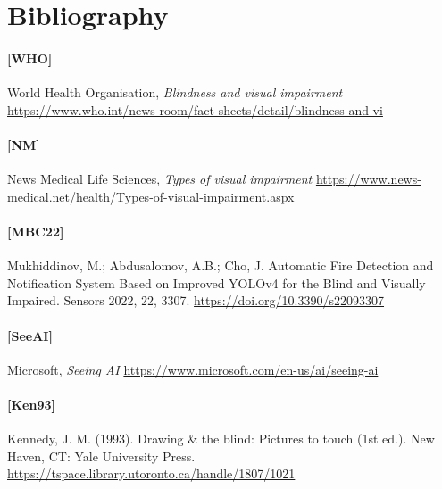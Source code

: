 \documentclass[12pt, letterpaper]{article}
\begin{document}
%

\section{Bibliography}

\paragraph{[WHO]}
\hypertarget{WHOtarget}{}
World Health Organisation, \textit{Blindness and visual impairment} \\
\href{https://www.who.int/news-room/fact-sheets/detail/blindness-and-visual-impairment}{https://www.who.int/news-room/fact-sheets/detail/blindness-and-vi}

\paragraph{[NM]}
\hypertarget{NMtarget}{}
News Medical Life Sciences, \textit{Types of visual impairment}
\href{https://www.news-medical.net/health/Types-of-visual-impairment.aspx}{https://www.news-medical.net/health/Types-of-visual-impairment.aspx}

\paragraph{[MBC22]}
\hypertarget{MBC22target}{}
Mukhiddinov, M.; Abdusalomov, A.B.; Cho, J. Automatic Fire Detection and Notification System Based on Improved YOLOv4 for the Blind and Visually Impaired. Sensors 2022, 22, 3307.
\href{https://doi.org/10.3390/s22093307}{https://doi.org/10.3390/s22093307}

\paragraph{[SeeAI]}
\hypertarget{SeeAItarget}{}
Microsoft, \textit{Seeing AI}
\href{https://www.microsoft.com/en-us/ai/seeing-ai}{https://www.microsoft.com/en-us/ai/seeing-ai}

\paragraph{[Ken93]}
\hypertarget{Ken93target}{}
Kennedy, J. M. (1993). Drawing \& the blind: Pictures to touch (1st ed.). New Haven, CT: Yale University Press.\\
\href{https://tspace.library.utoronto.ca/handle/1807/1021}{https://tspace.library.utoronto.ca/handle/1807/1021}
\end{document}
